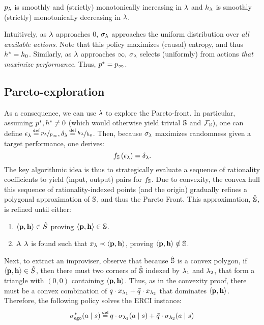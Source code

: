 \begin{proposition}
  $p_\lambda$ is smoothly and (strictly) monotonically increasing in $\lambda$ and $h_\lambda$
  is smoothly (strictly) monotonically decreasing in $\lambda$.
\end{proposition}

Intuitively, as $\lambda$ approaches $0$, $\sigma_\lambda$ approaches the
uniform distribution over \emph{all available actions}. Note that this
policy maximizes (causal) entropy, and thus $h^{*} = h_0$.
Similarly, as $\lambda$ approaches $\infty$, $\sigma_\lambda$ selects (uniformly) from
actions \emph{that maximize performance}. Thus, $p^{*} = p_\infty$.

\subsection{Pareto-exploration}
As a consequence, we can use $\lambda$ to explore the Pareto-front.
In particular, assuming $p^{*}, h^{*} \neq 0$ (which would
otherwise yield trivial $\mathbb{S}$ and $\mathcal{F}_{\mathbb{S}}$), one
can define $\epsilon_\rat \eqdef \nicefrac{\scp_\rat}{\scp_\infty}, \delta_\rat \eqdef \nicefrac{\rndp_\rat}{\rndp_0}$. Then, because
$\sigma_\lambda$ maximizes randomness given a target performance, one derives:
\begin{equation}
  f_\mathbb{S}\left(\epsilon_\lambda\right) = \delta_\lambda.
\end{equation}
The key algorithmic idea is thus to strategically evaluate a sequence
of rationality coefficients to yield (input, output) pairs for
$f_\mathbb{S}$. Due to convexity, the convex hull this sequence of
rationality-indexed points (and the origin) gradually refines a
polygonal approximation of $\mathbb{S}$, and thus the Pareto
Front. This approximation, $\hat{\mathbb{S}}$, is refined until
either:
\begin{enumerate}
\item $\langle \mathbf{p}, \mathbf{h} \rangle \in \hat{S}$ proving
  $\langle \mathbf{p}, \mathbf{h} \rangle \in \mathbb{S}$.
\item A $\lambda$ is found such that
  $x_{\lambda} \prec \langle \mathbf{p}, \mathbf{h} \rangle$, proving
  $\langle \mathbf{p}, \mathbf{h} \rangle \notin \mathbb{S}$.
\end{enumerate}
Next, to extract an improviser, observe that because
$\hat{\mathbb{S}}$ is a convex polygon, if $\langle \mathbf{p},
\mathbf{h} \rangle \in \hat{S}$, then there must two corners of
$\hat{\mathbb{S}}$ indexed by $\lambda_1$ and $\lambda_2$, that form a
triangle with $(0, 0)$ containing $\langle \mathbf{p}, \mathbf{h}
\rangle$. Thus, as in the convexity proof, there must be a convex
combination of $q\cdot x_{\lambda_1} + \bar{q}\cdot x_{\lambda_2}$ that
dominates $\langle \mathbf{p}, \mathbf{h} \rangle$. Therefore, the
following policy solves the ERCI instance:
\begin{equation}\label{eq:4}
  \sigma^*_\pOne(a\mid s) \eqdef q\cdot \sched_{\rat_1}(a\mid s) + \bar{q} \cdot \sched_{\rat_2}(a \mid s)
\end{equation}

